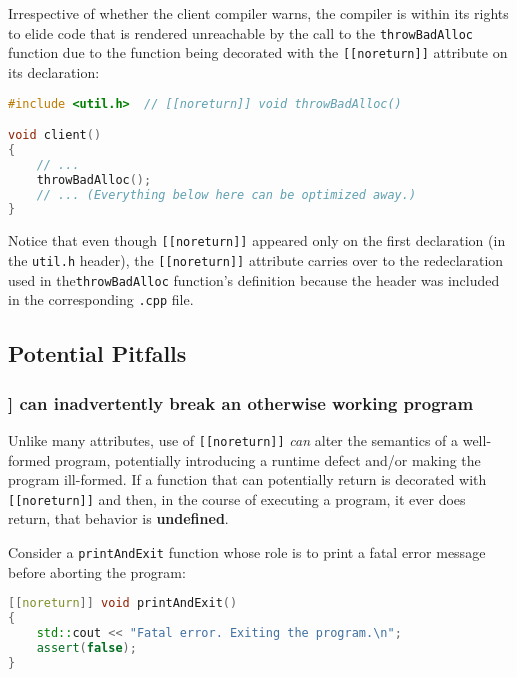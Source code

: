 \noindent Irrespective of whether the client compiler warns, the compiler is within its
rights to elide code that is rendered unreachable by the call to the
\texttt{throwBadAlloc} function due to the function being decorated with the
\texttt{[[noreturn]]} attribute on its declaration:

\begin{lstlisting}[language=C++]
#include <util.h>  // [[noreturn]] void throwBadAlloc()

void client()
{
    // ...
    throwBadAlloc();
    // ... (Everything below here can be optimized away.)
}
\end{lstlisting}
    

\noindent Notice that even though \texttt{[[noreturn]]} appeared only on the first
declaration (in the \texttt{util.h} header), the \texttt{[[noreturn]]}
attribute carries over to the redeclaration used in the\linebreak[4] \texttt{throwBadAlloc}
function's definition because the header was included in the
corresponding \texttt{.cpp} file.

\subsection[Potential Pitfalls]{Potential Pitfalls}\label{noreturn-potential-pitfalls}

\subsubsection[\tt{[[noreturn]]} can inadvertently break an otherwise working program]{{\ParaCode [[noreturn]]} can inadvertently break an otherwise working program}\label{[[noreturn]]-can-inadvertently-break-an-otherwise-working-program}

Unlike many attributes, use of \texttt{[[noreturn]]} \emph{can} alter
the semantics of a well-formed program, potentially introducing a
runtime defect and/or making the program ill-formed. If a function that
can potentially return is decorated with \texttt{[[noreturn]]} and then,
in the course of executing a program, it ever does return, that behavior
is \textbf{undefined}.

Consider a \texttt{printAndExit} function whose role is to print a fatal
error message before aborting the program:

\begin{lstlisting}[language=C++]
[[noreturn]] void printAndExit()
{
    std::cout << "Fatal error. Exiting the program.\n";
    assert(false);
}
\end{lstlisting}
    
